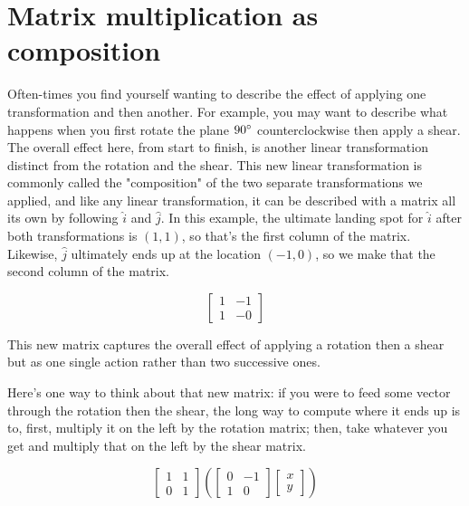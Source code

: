 \section{Matrix multiplication as composition}

Often-times you find yourself wanting to describe the effect of applying one
transformation and then another. For example, you may want to describe what
happens when you first rotate the plane $90\degree$ counterclockwise then apply
a shear. The overall effect here, from start to finish, is another linear
transformation distinct from the rotation and the shear. This new linear
transformation is commonly called the "composition" of the two separate
transformations we applied, and like any linear transformation, it can be
described with a matrix all its own by following $\hat{i}$ and $\hat{j}$. In
this example, the ultimate landing spot for $\hat{i}$ after both transformations
is $(1, 1)$, so that's the first column of the matrix. Likewise, $\hat{j}$
ultimately ends up at the location $(-1, 0)$, so we make that the second column
of the matrix.

\begin{equation*}
  \begin{bmatrix}
    1 & -1 \\
    1 & -0
  \end{bmatrix}
\end{equation*}

This new matrix captures the overall effect of applying a rotation then a shear
but as one single action rather than two successive ones.

Here's one way to think about that new matrix: if you were to feed some vector
through the rotation then the shear, the long way to compute where it ends up is
to, first, multiply it on the left by the rotation matrix; then, take whatever
you get and multiply that on the left by the shear matrix.

\begin{equation*}
  \begin{bmatrix}
    1 & 1 \\
    0 & 1
  \end{bmatrix}\left(
  \begin{bmatrix}
    0 & -1 \\
    1 & 0
  \end{bmatrix}
  \begin{bmatrix}
    x \\
    y
  \end{bmatrix}\right)
\end{equation*}

